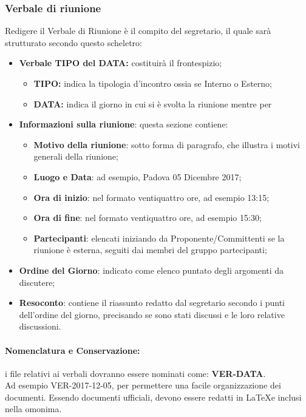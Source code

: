 \documentclass[NormeDiProgetto.tex]{subfiles}
\begin{document}
	\subsubsection{Verbale di riunione}
	Redigere il Verbale di Riunione è il compito del segretario, il quale sarà strutturato secondo questo scheletro:
	\begin{itemize}
		\item \textbf{Verbale TIPO del DATA:} costituirà il frontespizio;
		\begin{itemize}
			\item \textbf{TIPO:} indica la tipologia d'incontro ossia se Interno o Esterno;
			\item \textbf{DATA:} indica il giorno in cui si è svolta la riunione mentre per 
		\end{itemize}
		\item \textbf{Informazioni sulla riunione}: questa sezione contiene:
		\begin{itemize}
			\item \textbf{Motivo della riunione}: sotto forma di paragrafo, che illustra i motivi generali della riunione; 
			\item \textbf{Luogo e Data}: ad esempio, Padova 05 Dicembre 2017;
			\item \textbf{Ora di inizio}: nel formato ventiquattro ore, ad esempio 13:15;
			\item \textbf{Ora di fine}: nel formato ventiquattro ore, ad esempio 15:30;
			\item \textbf{Partecipanti}: elencati iniziando da Proponente/Committenti se la riunione è esterna, seguiti dai membri del gruppo partecipanti;
			\end{itemize}
			\item \textbf{Ordine del Giorno}: indicato come elenco puntato degli argomenti da discutere;
			\item \textbf{Resoconto}: contiene il riassunto redatto dal segretario secondo i punti dell'ordine del giorno, precisando se sono stati discussi e le loro relative discussioni.

	\end{itemize}
	\paragraph{Nomenclatura e Conservazione:} i file relativi ai verbali dovranno essere nominati come: \textbf{VER-DATA}.\\
	Ad esempio VER-2017-12-05, per permettere una facile organizzazione dei documenti.
	Essendo documenti ufficiali, devono essere redatti in \LaTeX e inclusi nella  omonima.
	
\end{document}
